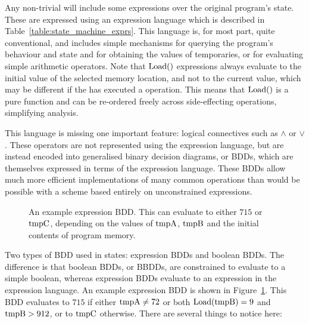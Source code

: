 Any non-trivial {\StateMachine} will include some expressions over the
original program's state.  These are expressed using an expression
language which is described in Table~\ref{table:state_machine_exprs}.
This language is, for most part, quite conventional, and includes
simple mechanisms for querying the program's behaviour and state and
for obtaining the values of {\StateMachine} temporaries, or for
evaluating simple arithmetic operators.  Note that $\mathrm{Load}()$
expressions always evaluate to the initial value of the selected
memory location, and not to the current value, which may be different
if the {\StateMachine} has executed a  operation.  This
means that $\mathrm{Load}()$ is a pure function and can be re-ordered freely
across side-effecting operations, simplifying analysis.

This language is missing one important feature: logical connectives
such as $\wedge$ or $\vee$.  These operators are not represented using
the expression language, but are instead encoded into generalised
binary decision diagrams, or BDDs\needCite{}, which are themselves
expressed in terms of the expression language.  These BDDs allow much
more efficient implementations of many common operations than would be
possible with a scheme based entirely on unconstrained expressions.

\begin{figure}
  \caption{An example expression BDD.  This can evaluate to either
    $715$ or $\mathrm{tmpC}$, depending on the values of $\mathrm{tmpA}$,
    $\mathrm{tmpB}$ and the initial contents of program memory.}
  \label{fig:derive:example_expr_bdd}
\end{figure}

Two types of BDD used in {\StateMachine} states: expression BDDs and
boolean BDDs.  The difference is that boolean BDDs, or BBDDs, are
constrained to evaluate to a simple boolean, whereas expression BDDs
evaluate to an expression in the expression language.  An example
expression BDD is shown in Figure~\ref{fig:derive:example_expr_bdd}.
This BDD evaluates to $715$ if either $\mathrm{tmpA} \not= 72$ or both
$\mathrm{Load}(\mathrm{tmpB}) = 9$ and $\mathrm{tmpB} > 912$, or to $\mathrm{tmpC}$
otherwise.  There are several things to notice here:

